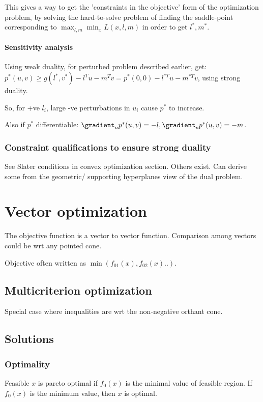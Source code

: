 \documentclass[oneside, article]{memoir}
\begin{document}
This gives a way to get the 'constraints in the objective' form of the optimization problem, by solving the hard-to-solve problem of finding the saddle-point corresponding to $\max_{l, m} \min_x L(x, l, m)$ in order to get $l^*, m^*$.

\subsubsection{Sensitivity analysis}
Using weak duality, for perturbed problem described earlier, get: \\
$p^{*}(u, v) \geq g(l^{*}, v^{*}) - l^{T}u - m^{T}v = p^{*}(0, 0)- l^{*T}u - m^{*T}v$, using strong duality.

So, for +ve $l_i$, large -ve perturbations in $u_i$ cause $p^{*}$ to increase.

Also if $p^{*}$ differentiable: $\gradient_u p^{*}(u, v) = -l, \gradient_v p^{*}(u, v) = -m$.


\subsection{Constraint qualifications to ensure strong duality}
See Slater conditions in convex optimization section. Others exist. Can derive some from the geometric/ supporting hyperplanes view of the dual problem.

\chapter{Vector optimization}
The objective function is a vector to vector function. Comparison among vectors could be wrt any pointed cone.

Objective often written as $\min (f_{01}(x), f_{02}(x) ..)$.

\section{Multicriterion optimization}
Special case where inequalities are wrt the non-negative orthant cone.

\section{Solutions}
\subsection{Optimality}
Feasible $x$ is pareto optimal if $f_0(x)$ is the minimal value of feasible region. If $f_0(x)$ is the minimum value, then $x$ is optimal.
\end{document}
